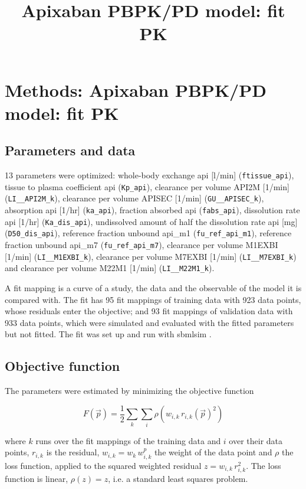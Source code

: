 \documentclass{article}
\title{Apixaban PBPK/PD model: fit PK}
\date{}
\begin{document}
\maketitle

\section{Methods: Apixaban PBPK/PD model: fit PK}

\subsection{Parameters and data}

13 parameters were optimized: whole-body exchange api [l/min] (\texttt{ftissue\_api}), tissue to plasma coefficient api (\texttt{Kp\_api}), clearance per volume API2M [1/min] (\texttt{LI\_\_API2M\_k}), clearance per volume APISEC [1/min] (\texttt{GU\_\_APISEC\_k}), absorption api [1/hr] (\texttt{ka\_api}), fraction absorbed api (\texttt{fabs\_api}), dissolution rate api [1/hr] (\texttt{Ka\_dis\_api}), undissolved amount of half the dissolution rate api [mg] (\texttt{D50\_dis\_api}), reference fraction unbound api\_m1 (\texttt{fu\_ref\_api\_m1}), reference fraction unbound api\_m7 (\texttt{fu\_ref\_api\_m7}), clearance per volume M1EXBI [1/min] (\texttt{LI\_\_M1EXBI\_k}), clearance per volume M7EXBI [1/min] (\texttt{LI\_\_M7EXBI\_k}) and clearance per volume M22M1 [1/min] (\texttt{LI\_\_M22M1\_k}).

A fit mapping is a curve of a study, the data and the observable of the model it is compared with. The fit has 95 fit mappings of training data with 923 data points, whose residuals enter the objective; and 93 fit mappings of validation data with 933 data points, which were simulated and evaluated with the fitted parameters but not fitted. The fit was set up and run with sbmlsim \cite{Koenig2026_sbmlsim}.

\subsection{Objective function}

The parameters were estimated by minimizing the objective function

\begin{equation}
F(\vec{p}) = \frac{1}{2} \sum_{k} \sum_{i} \rho\left(w_{i,k}\, r_{i,k}(\vec{p})^2\right)
\end{equation}

where $k$ runs over the fit mappings of the training data and $i$ over their data points, $r_{i,k}$ is the residual, $w_{i,k} = w_k\, w^{p}_{i,k}$ the weight of the data point and $\rho$ the loss function, applied to the squared weighted residual $z = w_{i,k}\, r_{i,k}^2$. The loss function is linear, $\rho(z) = z$, i.e. a standard least squares problem.
\end{document}
